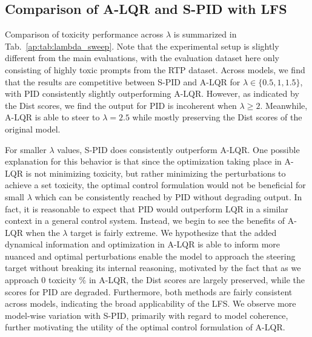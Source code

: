 \documentclass{article}
\theoremstyle{plain}
\theoremstyle{definition}
\theoremstyle{remark}
\begin{document}
\subsection{Comparison of A-LQR and S-PID with LFS}\label{ap:lqr_v_pid}
Comparison of toxicity performance across $\lambda$ is summarized in Tab.~\ref{ap:tab:lambda_sweep}. Note that the experimental setup is slightly different from the main evaluations, with the evaluation dataset here only consisting of highly toxic prompts from the RTP dataset. Across models, we find that the results are competitive between S-PID and A-LQR for $\lambda \in \{0.5, 1, 1.5\}$, with PID consistently slightly outperforming A-LQR. However, as indicated by the Dist scores, we find the output for PID is incoherent when $\lambda \geq 2$. Meanwhile, A-LQR is able to steer to $\lambda = 2.5$ while mostly preserving the Dist scores of the original model.

For smaller $\lambda$ values, S-PID does consistently outperform A-LQR. One possible explanation for this behavior is that since the optimization taking place in A-LQR is not minimizing toxicity, but rather minimizing the perturbations to achieve a set toxicity, the optimal control formulation would not be beneficial for small $\lambda$ which can be consistently reached by PID without degrading output. In fact, it is reasonable to expect that PID would outperform LQR in a similar context in a general control system. Instead, we begin to see the benefits of A-LQR when the $\lambda$ target is fairly extreme. We hypothesize that the added dynamical information and optimization in A-LQR is able to inform more nuanced and optimal perturbations enable the model to approach the steering target without breaking its internal reasoning, motivated by the fact that as we approach 0 toxicity $\%$ in A-LQR, the Dist scores are largely preserved, while the scores for PID are degraded. Furthermore, both methods are fairly consistent across models, indicating the broad applicability of the LFS. We observe more model-wise variation with S-PID, primarily with regard to model coherence, further motivating the utility of the optimal control formulation of A-LQR.
\end{document}
